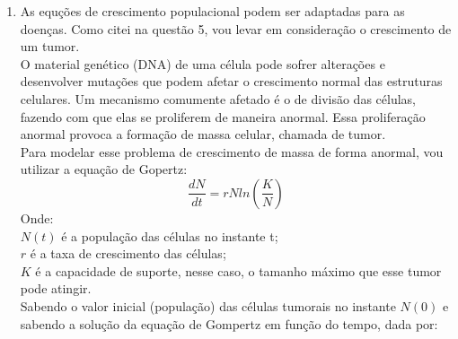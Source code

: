 \documentclass[a4paper]{article}
\begin{document}
\begin{enumerate}
Outro t\'opico interessante seria o crescimento de tumores.
\\
A grande maioria dos exemplos dado em sala, foram relacionados a din\^amica populacional, com ou sem competi\c{c}\~ao, e decaimento de poluentes, mostrando como isso afeta popula\c{c}\~oes. Contudo, exemplos com doen\c{c}as foram abordados apenas no final do curso. Esse tipo de exemplo daria mais dinamismo a aula.
\\
\item
As equ\c{c}\~oes de crescimento populacional podem ser adaptadas para as doen\c{c}as. Como citei na quest\~ao 5, vou levar em considera\c{c}\~ao o crescimento de um tumor.
\\
O material gen\'etico (DNA) de uma c\'elula pode sofrer altera\c{c}\~oes e desenvolver muta\c{c}\~oes que podem afetar o crescimento normal das estruturas celulares. Um mecanismo comumente afetado \'e o de divis\~ao das c\'elulas, fazendo com que elas se proliferem de maneira anormal. Essa prolifera\c{c}\~ao anormal provoca a forma\c{c}\~ao de massa celular, chamada de tumor.
\\
Para modelar esse problema de crescimento de massa de forma anormal, vou utilizar a equa\c{c}\~ao de Gopertz:
\\
\begin{equation}
\frac{dN}{dt} = r N ln (\frac{K}{N})
\end{equation}
Onde:
\\
$N(t)$ \'e a popula\c{c}\~ao das c\'elulas no instante t;
\\
$r$ \'e a taxa de crescimento das c\'elulas;
\\
$K$ \'e a capacidade de suporte, nesse caso, o tamanho m\'aximo que esse tumor pode atingir.
\\
Sabendo o valor inicial (popula\c{c}\~ao) das c\'elulas tumorais no instante $N(0)$ e sabendo a solu\c{c}\~ao da equa\c{c}\~ao de Gompertz em fun\c{c}\~ao do tempo, dada por:

\end{enumerate}
\end{document}
